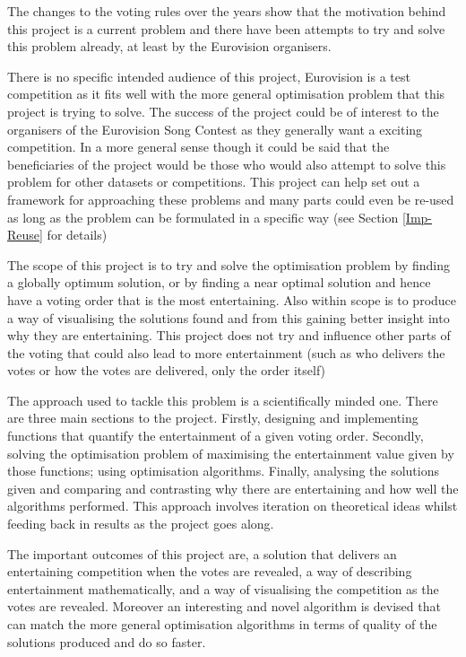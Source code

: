 \documentclass[12pt]{report}
\begin{document}
The changes to the voting rules over the years show that the motivation behind this project is a current problem and there have been attempts to try and solve this problem already, at least by the Eurovision organisers.

There is no specific intended audience of this project, Eurovision is a test competition as it fits well with the more general optimisation problem that this project is trying to solve. The success of the project could be of interest to the organisers of the Eurovision Song Contest as they generally want a exciting competition. In a more general sense though it could be said that the beneficiaries of the project would be those who would also attempt to solve this problem for other datasets or competitions. This project can help set out a framework for approaching these problems and many parts could even be re-used as long as the problem can be formulated in a specific way (see Section \ref{Imp-Reuse} for details)

The scope of this project is to try and solve the optimisation problem by finding a globally optimum solution, or by finding a near optimal solution and hence have a voting order that is the most entertaining. Also within scope is to produce a way of visualising the solutions found and from this gaining better insight into why they are entertaining. This project does not try and influence other parts of the voting that could also lead to more entertainment (such as who delivers the votes or  how the votes are delivered, only the order itself)

The approach used to tackle this problem is a scientifically minded one. There are three main sections to the project. Firstly, designing and implementing functions that quantify the entertainment of a given voting order. Secondly, solving the optimisation problem of maximising the entertainment value given by those functions; using optimisation algorithms. Finally, analysing the solutions given and comparing and contrasting why there are entertaining and how well the algorithms performed. This approach involves iteration on theoretical ideas whilst feeding back in results as the project goes along.

The important outcomes of this project are, a solution that delivers an entertaining competition when the votes are revealed, a way of describing entertainment mathematically, and a way of visualising the competition as the votes are revealed. Moreover an interesting and novel algorithm is devised that can match the more general optimisation algorithms in terms of quality of the solutions produced and do so faster.
\end{document}
